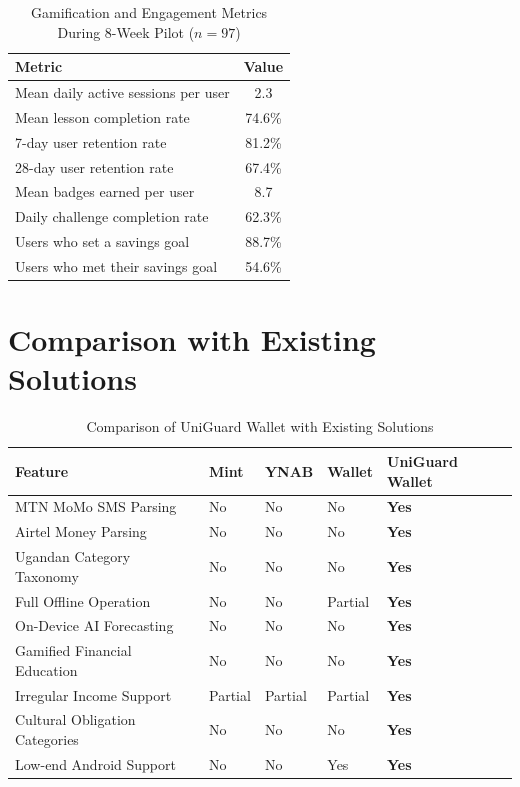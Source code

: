 \documentclass[12pt,a4paper]{report}
\begin{document}
\begin{table}[H]
\centering
\caption{Gamification and Engagement Metrics During 8-Week Pilot ($n = 97$)}
\label{tab:engagement}
\begin{tabular}{lc}
\toprule
\textbf{Metric} & \textbf{Value} \\
\midrule
Mean daily active sessions per user & 2.3 \\
Mean lesson completion rate         & 74.6\% \\
7-day user retention rate           & 81.2\% \\
28-day user retention rate          & 67.4\% \\
Mean badges earned per user         & 8.7 \\
Daily challenge completion rate     & 62.3\% \\
Users who set a savings goal        & 88.7\% \\
Users who met their savings goal    & 54.6\% \\
\bottomrule
\end{tabular}
\end{table}

\section{Comparison with Existing Solutions}

\begin{table}[H]
\centering
\caption{Comparison of UniGuard Wallet with Existing Solutions}
\label{tab:comparison}
\begin{tabular}{p{4cm} p{1.5cm} p{1.5cm} p{1.5cm} p{2.5cm}}
\toprule
\textbf{Feature} & \textbf{Mint} & \textbf{YNAB} & \textbf{Wallet} & \textbf{UniGuard Wallet} \\
\midrule
MTN MoMo SMS Parsing & No & No & No & \textbf{Yes} \\
Airtel Money Parsing & No & No & No & \textbf{Yes} \\
Ugandan Category Taxonomy & No & No & No & \textbf{Yes} \\
Full Offline Operation & No & No & Partial & \textbf{Yes} \\
On-Device AI Forecasting & No & No & No & \textbf{Yes} \\
Gamified Financial Education & No & No & No & \textbf{Yes} \\
Irregular Income Support & Partial & Partial & Partial & \textbf{Yes} \\
Cultural Obligation Categories & No & No & No & \textbf{Yes} \\
Low-end Android Support & No & No & Yes & \textbf{Yes} \\
\bottomrule
\end{tabular}
\end{table}
\end{document}
